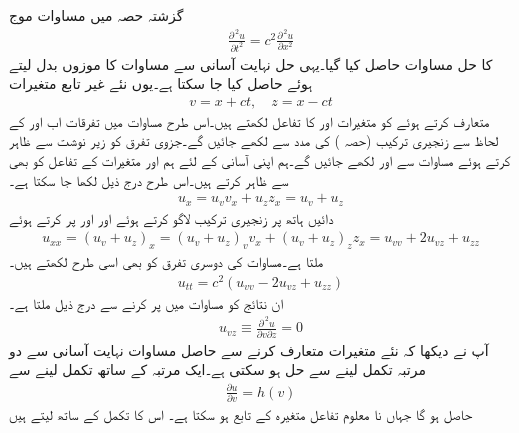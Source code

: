 گزشتہ حصہ میں مساوات موج
\begin{align}\label{مساوات_جزوی_موج_مساوات_الف}
\frac{\partial^{\,2}u}{\partial t^2}=c^2\frac{\partial^{\,2}u}{\partial x^2}
\end{align}
کا حل مساوات  حاصل کیا گیا۔یہی حل نہایت آسانی سے مساوات  کا موزوں بدل لیتے ہوئے حاصل کیا جا سکتا ہے۔یوں نئے غیر تابع متغیرات
\begin{align}\label{مساوات_جزوی_موج_مساوات_ب}
v=x+ct,\quad z=x-ct
\end{align}
متعارف کرتے ہوئے  کو متغیرات  اور  کا تفاعل لکھتے ہیں۔اس طرح مساوات  میں تفرقات اب  اور  کے لحاظ سے زنجیری ترکیب (حصہ )  کی مدد سے لکھے جائیں گے۔جزوی تفرق کو زیر نوشت سے ظاہر کرتے ہوئے  مساوات  سے  اور  لکھے جائیں گے۔ہم اپنی آسانی کے لئے ہم  اور  متغیرات کے تفاعل کو بھی  سے ظاہر کرتے ہیں۔اس طرح درج ذیل لکھا جا سکتا ہے۔
\begin{align*}
u_x=u_vv_x+u_zz_x=u_v+u_z
\end{align*}
دائیں ہاتھ پر زنجیری ترکیب لاگو کرتے ہوئے اور  اور  پر کرتے ہوئے
\begin{align*}
u_{xx}=(u_v+u_z)_x=(u_v+u_z)_vv_x+(u_v+u_z)_zz_x=u_{vv}+2u_{vz}+u_{zz}
\end{align*}
ملتا ہے۔مساوات  کی دوسری تفرق کو بھی اسی طرح لکھتے ہیں۔
\begin{align*}
u_{tt}=c^2(u_{vv}-2u_{vz}+u_{zz})
\end{align*}
ان نتائج کو مساوات  میں پر کرنے سے درج ذیل ملتا ہے۔
\begin{align}\label{مساوات_جزوی_موج_مساوات_پ}
u_{vz}\equiv \frac{\partial^{\,2}u}{\partial v\partial z}=0
\end{align}
آپ نے دیکھا کہ نئے متغیرات متعارف کرنے سے حاصل مساوات  نہایت آسانی سے دو مرتبہ تکمل لینے سے حل ہو سکتی ہے۔ایک مرتبہ  کے ساتھ تکمل لینے سے
\begin{align*}
\frac{\partial u}{\partial v}=h(v)
\end{align*}
حاصل ہو گا جہاں نا معلوم تفاعل  متغیرہ  کے تابع ہو سکتا ہے۔ اس کا تکمل  کے ساتھ لیتے ہیں
